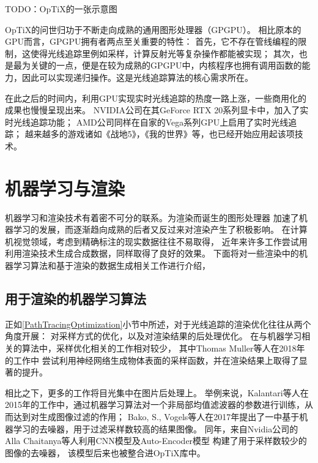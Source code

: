 TODO：OpTiX的一张示意图

OpTiX的问世归功于不断走向成熟的通用图形处理器（GPGPU）。
相比原本的GPU而言，GPGPU拥有者两点至关重要的特性：
首先，它不存在管线编程的限制，这使得光线追踪里例如采样，计算反射光等复杂操作都能被实现；
其次，也是最为关键的一点，便是在较为成熟的GPGPU中，内核程序也拥有调用函数的能力，因此可以实现递归操作。这是光线追踪算法的核心需求所在。

在此之后的时间内，利用GPU实现实时光线追踪的热度一路上涨，一些商用化的成果也慢慢呈现出来。
NVIDIA公司在其GeForce RTX 20系列显卡中，加入了实时光线追踪功能\cite{RTXOn}；
AMD公司同样在自家的Vega系列GPU上启用了实时光线追踪\cite{Vega}；
越来越多的游戏诸如《战地5》，《我的世界》等，也已经开始应用起该项技术。 

\section{机器学习与渲染}

机器学习和渲染技术有着密不可分的联系。为渲染而诞生的图形处理器
加速了机器学习的发展，而逐渐趋向成熟的后者又反过来对渲染产生了积极影响。
在计算机视觉领域，考虑到精确标注的现实数据往往不易取得，
近年来许多工作尝试用利用渲染技术生成合成数据，同样取得了良好的效果。
下面将对一些渲染中的机器学习算法和基于渲染的数据生成相关工作进行介绍，

\subsection{用于渲染的机器学习算法}

\label{MLDenoiser}
正如\ref{PathTracingOptimization}小节中所述，对于光线追踪的渲染优化往往从两个角度开展：
对采样方式的优化，以及对渲染结果的后处理优化。
在与机器学习相关的算法中，采样优化相关的工作相对较少，
其中Thomas Muller等人在2018年的工作\cite{Mller2018NeuralIS}中
尝试利用神经网络生成物体表面的采样函数，并在渲染结果上取得了显著的提升。

相比之下，更多的工作将目光集中在图片后处理上。
举例来说，Kalantari等人在2015年的工作中\cite{kalantari2015machine}，通过机器学习算法对一个非局部均值滤波器的参数进行训练，从而达到对生成图像过滤的作用；
Bako, S., Vogels等人在2017年提出了一中基于机器学习的去噪器\cite{bako2017kernel}，用于过滤采样数较高的结果图像。
同年，\label{AIDnoiser}来自Nvidia公司的Alla Chaitanya等人利用CNN模型及Auto-Encoder模型
构建了用于采样数较少的图像的去噪器\cite{chaitanya2017interactive}，
该模型后来也被整合进OpTiX库中。

